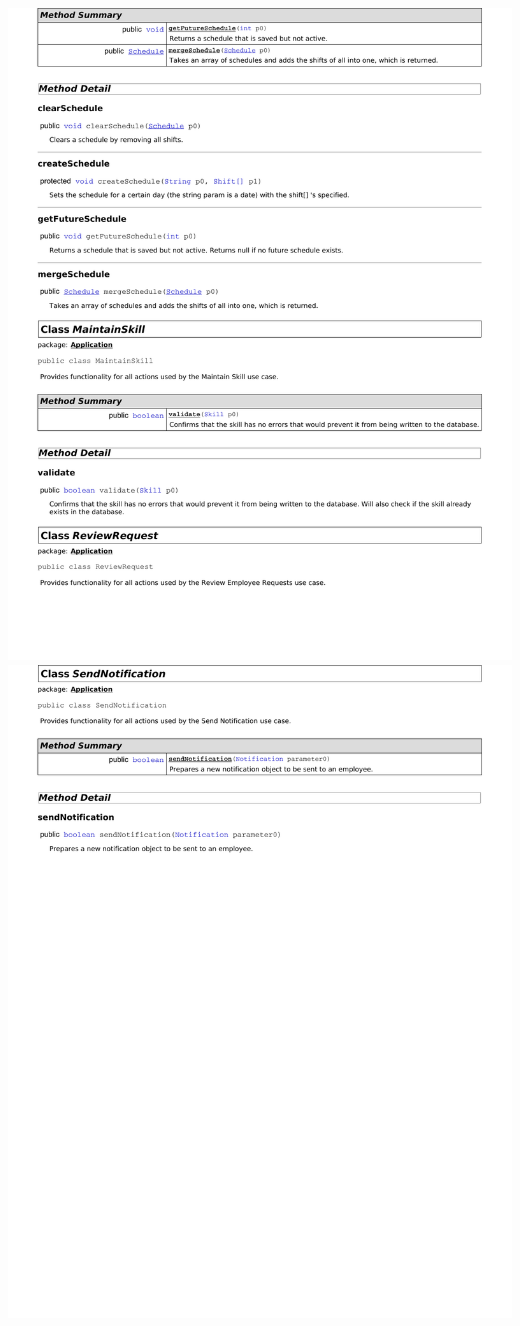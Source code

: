 \documentclass[letterpaper,12pt]{report}
\begin{document}
\newpage
\includegraphics[scale=0.9,trim=20mm 30mm 25mm 8mm]{externals/dd4.pdf}
\newpage
\includegraphics[scale=0.9,trim=20mm 30mm 25mm 8mm]{externals/dd5.pdf}
\newpage
\end{document}
